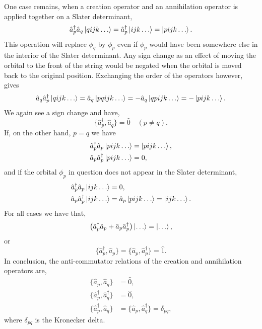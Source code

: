     One case remains, when a creation operator and an annihilation operator is
    applied together on a Slater determinant,
    \begin{equation}
        \hat{a}_p^\dagger \hat{a}_q \ket{qijk \dots} 
            = \hat{a}_p^\dagger \ket{ijk \dots}
            = \ket{pijk \dots}.
    \end{equation}
    This operation will replace $\phi_q$ by $\phi_p$ even if $\phi_p$ would have
    been somewhere else in the interior of the Slater determinant. Any sign change
    as an effect of moving the orbital to the front of the string would be negated
    when the orbital is moved back to the original position. Exchanging the order
    of the operators however, gives
    \begin{equation}
        \hat{a}_q \hat{a}_p^\dagger \ket{qijk \dots} 
            = \hat{a}_q \ket{pqijk \dots} 
            = -\hat{a}_q \ket{qpijk \dots}
            = -\ket{pijk \dots}.
    \end{equation}
    We again see a sign change and have,
    \begin{equation}
        \{\hat{a}_p^\dagger, \hat{a}_q\} = \hat{0} \quad (p \neq q).
    \end{equation}
    If, on the other hand, $p=q$ we have 
    \begin{equation}
        \begin{aligned}
            \hat{a}_p^\dagger \hat{a}_p \ket{pijk \dots} &= \ket{pijk \dots}, \\
            \hat{a}_p \hat{a}_p^\dagger \ket{pijk \dots} &= 0,
        \end{aligned}
    \end{equation}
    and if the orbital $\phi_p$ in question does not appear in the Slater 
    determinant,
    \begin{equation}
        \begin{aligned}
            \hat{a}_p^\dagger \hat{a}_p \ket{ijk \dots} &= 0, \\
            \hat{a}_p \hat{a}_p^\dagger \ket{ijk \dots} &= 
                \hat{a}_p\ket{pijk \dots} = \ket{ijk \dots}.           
        \end{aligned}
    \end{equation} 
    For all cases we have that,
    \begin{equation}
        \left(\hat{a}_p^\dagger \hat{a}_p + \hat{a}_p \hat{a}_p^\dagger \right)
        \ket{\dots} = \ket{\dots},
    \end{equation}
    or
    \begin{equation}
        \{\hat{a}_p^\dagger, \hat{a}_p\} = \{\hat{a}_p, \hat{a}_p^\dagger\} = \hat{1}.
    \end{equation}
    In conclusion, the anti-commutator relations of the creation and annihilation
    operators are,
    \begin{align}
        \{\hat{a}_p, \hat{a}_q\} &= \hat{0}, \\
        \{\hat{a}_p^\dagger, \hat{a}_q^\dagger\} &= \hat{0}, \\
        \{\hat{a}_p^\dagger, \hat{a}_q\} &= \{\hat{a}_p, \hat{a}_q^\dagger\} 
         = \delta_{pq},
    \end{align}
    where $\delta_{pq}$ is the Kronecker delta.

